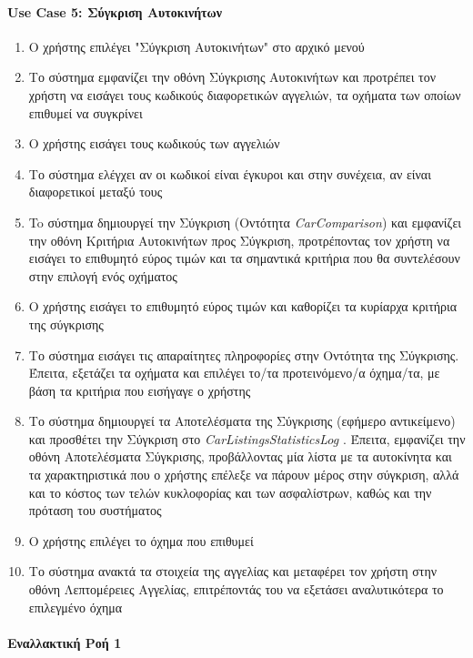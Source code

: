 \documentclass{../ol-softwaremanual}
\begin{document}
	\paragraph{\en Use Case 5: \gr Σύγκριση Αυτοκινήτων}
	\begin{enumerate}
		\item Ο χρήστης επιλέγει \en"\gr Σύγκριση Αυτοκινήτων\en" \gr στο αρχικό μενού
		\item Το σύστημα εμφανίζει την οθόνη Σύγκρισης Αυτοκινήτων και προτρέπει τον χρήστη να εισάγει τους κωδικούς διαφορετικών αγγελιών, τα οχήματα των οποίων επιθυμεί να συγκρίνει
		\item Ο χρήστης εισάγει τους κωδικούς των αγγελιών
		\item Το σύστημα ελέγχει αν οι κωδικοί είναι έγκυροι και στην συνέχεια, αν είναι διαφορετικοί μεταξύ τους		
		\item To σύστημα δημιουργεί την Σύγκριση (Οντότητα \en \textit{CarComparison}\gr) και εμφανίζει την οθόνη Κριτήρια Αυτοκινήτων προς Σύγκριση, προτρέποντας τον χρήστη να εισάγει το επιθυμητό εύρος τιμών και τα σημαντικά κριτήρια που θα συντελέσουν στην επιλογή ενός οχήματος
		\item Ο χρήστης εισάγει το επιθυμητό εύρος τιμών και καθορίζει τα κυρίαρχα κριτήρια της σύγκρισης
		\item Το σύστημα εισάγει τις απαραίτητες πληροφορίες στην Οντότητα της Σύγκρισης. Έπειτα, εξετάζει τα οχήματα και επιλέγει το/τα προτεινόμενο/α όχημα/τα, με βάση τα κριτήρια που εισήγαγε ο χρήστης
		\item Το σύστημα δημιουργεί τα Αποτελέσματα της Σύγκρισης (εφήμερο αντικείμενο) και προσθέτει την Σύγκριση στο \en \textit{CarListingsStatisticsLog} \gr. Έπειτα, εμφανίζει την οθόνη Αποτελέσματα Σύγκρισης, προβάλλοντας μία λίστα με τα αυτοκίνητα και τα χαρακτηριστικά που ο χρήστης επέλεξε να πάρουν μέρος στην σύγκριση, αλλά και το κόστος των τελών κυκλοφορίας και των ασφαλίστρων, καθώς και την πρόταση του συστήματος 
		\item Ο χρήστης επιλέγει το όχημα που επιθυμεί
		\item Το σύστημα ανακτά τα στοιχεία της αγγελίας και μεταφέρει τον χρήστη στην οθόνη Λεπτομέρειες Αγγελίας, επιτρέποντάς του να εξετάσει αναλυτικότερα το επιλεγμένο όχημα
	\end{enumerate}
	
	\paragraph{Εναλλακτική Ροή 1}
	
\end{document}
